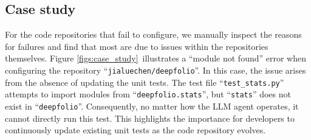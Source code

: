 \subsection{Case study}


For the code repositories that fail to configure, we manually inspect the reasons for failures and find that most are due to issues within the repositories themselves. Figure \ref{figs:case_study}~illustrates a ``module not found'' error when configuring the repository ``\texttt{jialuechen/deepfolio}''. In this case, the issue arises from the absence of updating the unit tests. The test file ``\texttt{test\_stats.py}'' attempts to import modules from ``\texttt{deepfolio.stats}'', but ``\texttt{stats}'' does not exist in ``\texttt{deepfolio}''. Consequently, no matter how the LLM agent operates, it cannot directly run this test. This highlights the importance for developers to continuously update existing unit tests as the code repository evolves.

